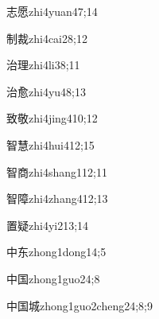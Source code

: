 \begin{verbete}{志愿}{zhi4yuan4}{7;14}
\end{verbete}

\begin{verbete}{制裁}{zhi4cai2}{8;12}
\end{verbete}

\begin{verbete}{治理}{zhi4li3}{8;11}
\end{verbete}

\begin{verbete}{治愈}{zhi4yu4}{8;13}
\end{verbete}

\begin{verbete}{致敬}{zhi4jing4}{10;12}
\end{verbete}

\begin{verbete}{智慧}{zhi4hui4}{12;15}
\end{verbete}

\begin{verbete}{智商}{zhi4shang1}{12;11}
\end{verbete}

\begin{verbete}{智障}{zhi4zhang4}{12;13}
\end{verbete}

\begin{verbete}{置疑}{zhi4yi2}{13;14}
\end{verbete}

\begin{verbete}{中东}{zhong1dong1}{4;5}
\end{verbete}

\begin{verbete}{中国}{zhong1guo2}{4;8}
\end{verbete}

\begin{verbete}{中国城}{zhong1guo2cheng2}{4;8;9}
\end{verbete}

